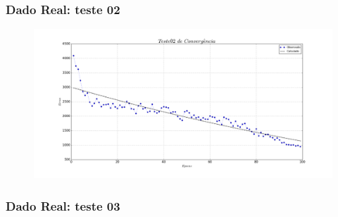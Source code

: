 \documentclass[aspectratio=10]{beamer} %
\begin{document}
\begin{frame}
	\frametitle{Dado Real: teste 02}
	\begin{figure}[H]
		\centering
		\includegraphics[scale=0.2]{Imagens/conv02.png}
		\label{Conv02}
	\end{figure} 
\end{frame}

\begin{frame}
	\frametitle{Dado Real: teste 03}
	\begin{figure}[H]
		\centering
		\qquad
		\qquad
		\qquad
		\label{SOMt03}
	\end{figure}
\end{frame}
\end{document}

